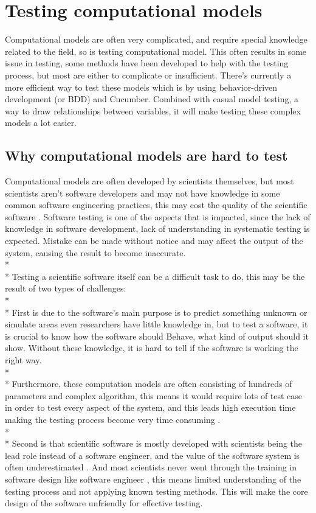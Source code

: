 \section{Testing computational models}
Computational models are often very complicated, and require special knowledge related to the field, so is testing computational model. This often results in some issue in testing, some methods have been developed to help with the testing process, but most are either to complicate or insufficient. There’s currently a more efficient way to test these models which is by using behavior-driven development (or BDD) and Cucumber. Combined with casual model testing, a way to draw relationships between variables, it will make testing these complex models a lot easier.

\subsection{Why computational models are hard to test}
Computational models are often developed by scientists themselves, but most scientists aren’t software developers and may not have knowledge in some common software engineering practices, this may cost the quality of the scientific software \cite{Reference6}. Software testing is one of the aspects that is impacted, since the lack of knowledge in software development, lack of understanding in systematic testing is expected. Mistake can be made without notice and may affect the output of the system, causing the result to become inaccurate.\\*\\*
Testing a scientific software itself can be a difficult task to do, this may be the result of two types of challenges: \\*\\*
First is due to the software’s main purpose is to predict something unknown or simulate areas even researchers have little knowledge in, but to test a software, it is crucial to know how the software should Behave, what kind of output should it show. 
Without these knowledge, it is hard to tell if the software is working the right way. \\*\\*
Furthermore, these computation models are often consisting of hundreds of parameters and complex algorithm, this means it would require lots of test case in order to test every aspect of the system, and this leads high execution time making the testing process become very time consuming \cite{Reference6}.\\*\\*
Second is that scientific software is mostly developed with scientists being the lead role instead of a software engineer, and the value of the software system is often underestimated \cite{Reference6}. And most scientists never went through the training in software design like software engineer \cite{Reference7}, this means limited understanding of the testing process and not applying known testing methods. This will make the core design of the software unfriendly for effective testing.

